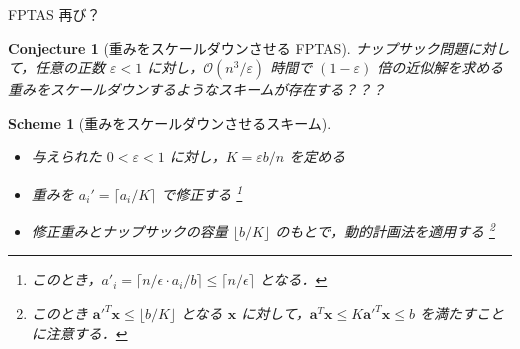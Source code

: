 \documentclass[aspectratio=169]{beamer}
\newtheorem{scheme}{Scheme}
\newtheorem{conjecture}{Conjecture}
\begin{document}
\begin{frame}{FPTAS 再び？}

	\begin{conjecture}[\alert{重みをスケールダウンさせる FPTAS}]
		ナップサック問題に対して，任意の正数 \(\varepsilon < 1\) に対し，\alert{\(\mathcal{O}(n^3/\varepsilon)\)} 時間で \alert{\((1 - \varepsilon)\)} 倍の近似解を求める重みをスケールダウンするようなスキームが存在する？？？
	\end{conjecture}

	\begin{scheme}[重みをスケールダウンさせるスキーム]
		\begin{itemize}
			\item 与えられた \(0 < \varepsilon < 1\) に対し，\alert{\(K = \varepsilon b / n\)} を定める
			\item 重みを \alert{\(a_i' = \lceil a_i / K \rceil\)} で修正する%
			      \footnote{このとき，\(a'_i = \lceil n / \epsilon \cdot a_i / b\rceil \le \lceil n / \epsilon \rceil \) となる．}
			\item 修正重みとナップサックの容量 \alert{\(\lfloor b / K \rfloor\)} のもとで，動的計画法を適用する%
			      \footnote{このとき \(\boldsymbol{a'}^T\boldsymbol{x} \le \lfloor b / K\rfloor\) となる \(\boldsymbol{x}\) に対して，\(\boldsymbol{a}^T\boldsymbol{x} \le K \boldsymbol{a'}^T\boldsymbol{x} \le b\) を満たすことに注意する．}
		\end{itemize}
	\end{scheme}
\end{frame}

\end{document}

